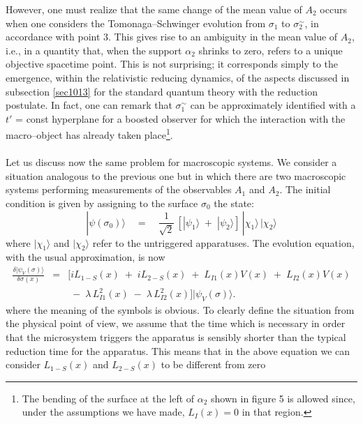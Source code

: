 \documentclass[12pt]{article}
\begin{document}
However, one must realize that the same change of the mean value
of $A_{2}$ occurs when one considers the Tomonaga--Schwinger
evolution from $\sigma_{1}$ to $\sigma_{2}^{\sim}$, in accordance
with point 3. This gives rise to an ambiguity in the mean value of
$A_{2}$, i.e., in a quantity that, when the support $\alpha_{2}$
shrinks to zero, refers to a unique objective spacetime point.
This is not surprising; it corresponds simply to the emergence,
within the relativistic reducing dynamics, of the aspects
discussed in subsection \ref{sec1013} for the standard quantum
theory with the reduction postulate. In fact, one can remark that
$\sigma_{1}^{\sim}$ can be approximately identified with a $t'$ =
const hyperplane for a boosted observer for which the interaction
with the macro--object has already taken place\footnote{The
bending of the surface at the left of $\alpha_{2}$ shown in figure
5 is allowed since, under the assumptions we have made, $L_{I}(x)
= 0$ in that region.}.
\\ \\
 Let us discuss now the same problem for
macroscopic systems. We consider a situation analogous to the
previous one but in which there are two macroscopic systems
performing measurements of the observables $A_{1}$ and $A_{2}$.
The initial condition is given by assigning to the surface
$\sigma_{0}$ the state:
\begin{equation}
|\psi(\sigma_{0})\rangle \quad = \quad \frac{1}{\sqrt{2}}\, [
|\psi_{1}\rangle \; + \; |\psi_{2}\rangle ]\, |\chi_{1}\rangle\,
|\chi_{2}\rangle
\end{equation}
where $|\chi_{1}\rangle$ and $|\chi_{2}\rangle$ refer to the
untriggered apparatuses. The evolution equation, with the usual
approximation, is now
\begin{eqnarray} \label{qeqgter}
\frac{\delta |\psi_{V}(\sigma)\rangle}{\delta\sigma(x)} & = & [i
L_{1-S}(x) \; + \; i L_{2-S}(x) \; + \; L_{I1}(x)V(x)
\; + \; L_{I2}(x)V(x) \nonumber \\
& & \; - \; \lambda\, L_{I1}^{2}(x) \; - \; \lambda\,
L_{I2}^{2}(x) ] |\psi_{V}(\sigma)\rangle.
\end{eqnarray}
where the meaning of the symbols is obvious. To clearly define the
situation from the physical point of view, we assume that the time
which is necessary in order that the microsystem triggers the
apparatus is sensibly shorter than the typical reduction time for
the apparatus. This means that in the above equation we can
consider $L_{1-S}(x)$ and $L_{2-S}(x)$ to be different from zero
\end{document}
